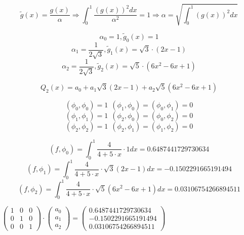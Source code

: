 \begin{displaymath}
\tilde{g}(x) = \frac{g(x)}{\alpha} \Rightarrow \int_0^1 \frac{(g(x))^2dx}{\alpha^2} = 1 \Rightarrow \alpha = \sqrt{\int_0^1 (g(x))^2dx}
\end{displaymath}

\begin{displaymath}
\alpha_0 = 1, \tilde{g}_0(x) = 1
\end{displaymath}
\begin{displaymath}
\alpha_1 = \frac{1}{2 \sqrt{3}}, \tilde{g}_1(x) = \sqrt{3} \cdot (2x - 1)
\end{displaymath}
\begin{displaymath}
\alpha_2 = \frac{1}{2 \sqrt{3}}, \tilde{g}_2(x) = \sqrt{5} \cdot (6x^2 - 6x + 1)
\end{displaymath}

\begin{displaymath}
Q_2(x) = a_0 + a_1 \sqrt{3}(2x - 1) + a_2 \sqrt{5}(6x^2 - 6x + 1)
\end{displaymath}

\begin{displaymath}
(\phi_0, \phi_0) = 1 \ \ (\phi_1, \phi_0) = (\phi_0, \phi_1) = 0
\end{displaymath}
\begin{displaymath}
(\phi_1, \phi_1) = 1 \ \ (\phi_2, \phi_0) = (\phi_0, \phi_2) = 0
\end{displaymath}
\begin{displaymath}
(\phi_2, \phi_2) = 1 \ \ (\phi_2, \phi_1) = (\phi_1, \phi_2) = 0
\end{displaymath}

\begin{displaymath}
(f, \phi_0) = \int_0^1 \frac{4}{4 + 5 \cdot x} \cdot 1 dx = 0.6487441729730634
\end{displaymath}
\begin{displaymath}
(f, \phi_1) = \int_0^1 \frac{4}{4 + 5 \cdot x} \cdot \sqrt{3} (2x - 1) dx = -0.1502291665191494
\end{displaymath}
\begin{displaymath}
(f, \phi_2) = \int_0^1 \frac{4}{4 + 5 \cdot x} \cdot \sqrt{5} (6x^2 - 6x + 1) dx = 0.03106754266894511
\end{displaymath}

$
\begin{pmatrix}
1 & 0 & 0
\\
0 & 1 & 0
\\
0 & 0 & 1
\end{pmatrix}
\cdot
\begin{pmatrix}
a_0
\\
a_1
\\
a_2
\end{pmatrix}
=
\begin{pmatrix}
0.6487441729730634
\\
-0.1502291665191494
\\
0.03106754266894511
\end{pmatrix}
$\\[1mm]

